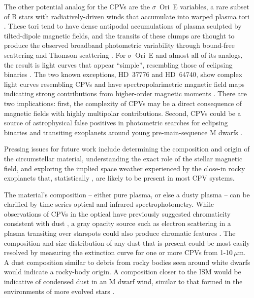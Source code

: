\documentclass{nature3}
\begin{document}
The other potential analog for the CPVs are the $\sigma$~Ori~E
variables, a rare subset of B stars with radiatively-driven winds
that accumulate into
warped plasma tori \cite{Townsend2005,Townsend2008}.  These tori tend
to have dense antipodal accumulations of plasma sculpted by
tilted-dipole magnetic fields, and the transits of
these clumps are thought to produce the observed broadband photometric variability
through bound-free scattering \cite{Townsend2005} and
Thomson scattering \cite{Berry2022}.  For $\sigma$~Ori~E and almost
all of its analogs, the result is light curves that appear ``simple'',
resembling those of eclipsing binaries \cite{Townsend2008}.  The two known
exceptions, HD~37776 and HD~64740, show complex light curves
resembling CPVs \cite{Mikulasek2020,Bouma2024} and have
spectropolarimetric magnetic field maps indicating strong
contributions from higher-order magnetic moments
\cite{Kochukhov2011,Shultz2018}.  There are two implications: first,
the complexity of CPVs may be a direct consequence of magnetic fields
with highly multipolar contributions.  Second, CPVs could be a
source of astrophysical false positives in photometric searches for
eclipsing binaries and transiting exoplanets around young
pre-main-sequence M dwarfs \cite{Johns-Krull2016,Bouma2020}.

Pressing issues for future work include determining the composition
and origin of the circumstellar material, understanding the exact role
of the stellar magnetic field, and exploring the implied space weather
experienced by the close-in rocky exoplanets that, statistically
\cite{Dressing2015}, are likely to be present in most CPV systems.

The material's composition -- either pure plasma, or else a dusty
plasma -- can be clarified by time-series optical and infrared
spectrophotometry.  While observations of CPVs in the optical have
previously suggested chromaticity consistent with dust \cite{Tanimoto2020,Gunther2022,Koen2023},
a gray opacity source such as electron scattering in a plasma
transiting over starspots could also produce chromatic features
\cite{Rackham2018}.  The composition and size distribution of any dust
that is present could be most easily resolved by measuring the
extinction curve for one or more CPVs from 1-10\,$\mu$m.  A
dust composition similar to debris from rocky bodies seen around white
dwarfs \cite{Reach2009} would indicate a rocky-body origin.  A 
composition closer to the ISM would be indicative of condensed dust in
an M dwarf wind, similar to that formed in the environments of more
evolved stars \cite{Marigo2008}.
\end{document}
